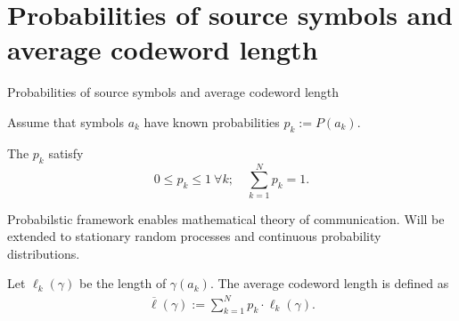 \section{Probabilities of source symbols and average codeword length}
\begin{frame}{Probabilities of source symbols and average codeword length}
\bit
\item Assume that symbols $a_k$ have known probabilities $p_k:=P(a_k)$.
\item The  $p_k$ satisfy
\begin{equation*}
\boxed{0 \leq p_k\leq 1 \:\forall k; \quad \sum_{k=1}^Np_k=1.} 
\end{equation*}
\item Probabilstic framework enables mathematical theory of communication. Will be extended to stationary random processes 
and continuous probability distributions.
\eit 
\smallskip
{}
\bit
\item Let $\ell_k(\gamma)$ be the length of $\gamma(a_k)$. The average codeword length is defined as
\begin{align*}
\overline{\ell}(\gamma):=\sum_{k=1}^Np_k\cdot \ell_k(\gamma).
\end{align*} 
\item[\iarrow]
\eit
\end{frame}




